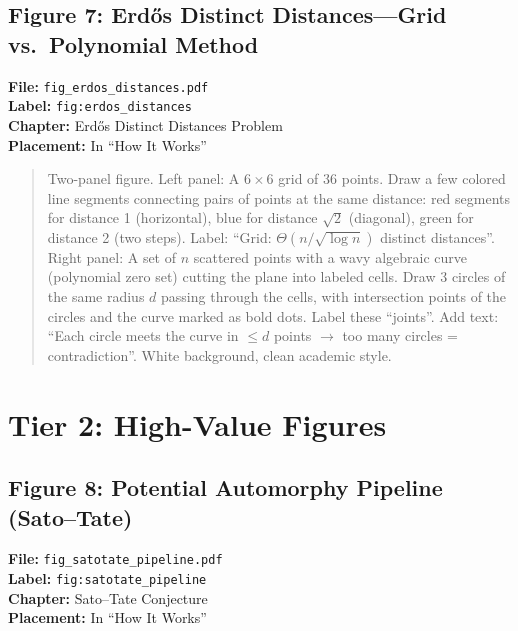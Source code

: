 \subsection*{Figure 7: Erdős Distinct Distances---Grid vs.\ Polynomial Method}
\textbf{File:} \texttt{fig\_erdos\_distances.pdf} \\
\textbf{Label:} \texttt{fig:erdos\_distances} \\
\textbf{Chapter:} Erdős Distinct Distances Problem \\
\textbf{Placement:} In ``How It Works''

\begin{quote}
Two-panel figure. Left panel: A $6 \times 6$ grid of 36 points. Draw a few colored line segments connecting pairs of points at the same distance: red segments for distance 1 (horizontal), blue for distance $\sqrt{2}$ (diagonal), green for distance 2 (two steps). Label: ``Grid: $\Theta(n/\sqrt{\log n})$ distinct distances''. Right panel: A set of $n$ scattered points with a wavy algebraic curve (polynomial zero set) cutting the plane into labeled cells. Draw 3 circles of the same radius $d$ passing through the cells, with intersection points of the circles and the curve marked as bold dots. Label these ``joints''. Add text: ``Each circle meets the curve in $\leq d$ points $\to$ too many circles = contradiction''. White background, clean academic style.
\end{quote}


\section*{Tier 2: High-Value Figures}

\subsection*{Figure 8: Potential Automorphy Pipeline (Sato--Tate)}
\textbf{File:} \texttt{fig\_satotate\_pipeline.pdf} \\
\textbf{Label:} \texttt{fig:satotate\_pipeline} \\
\textbf{Chapter:} Sato--Tate Conjecture \\
\textbf{Placement:} In ``How It Works''

